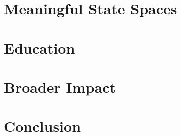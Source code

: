 \documentclass[12pt]{cmuthesis}
\begin{document}


\chapter{Meaningful State Spaces}
\label{chap:pps}

\chapter{Education}
\label{chap:410}

\chapter{Broader Impact}
\label{chap:lipservice}







\chapter{Conclusion}

%

\backmatter


\renewcommand{\bibsection}{\chapter{\bibname}}

\end{document}
